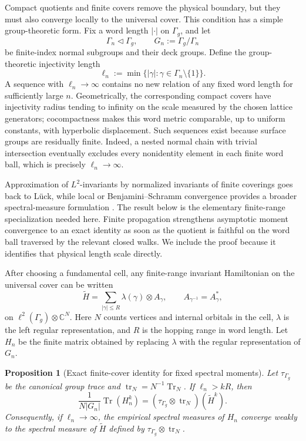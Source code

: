 \documentclass[11pt]{article}
\newtheorem{proposition}[theorem]{Proposition}
\theoremstyle{definition}
\theoremstyle{remark}
\newcommand{\CC}{\mathbb C}
\newcommand{\Tr}{\operatorname{Tr}}
\newcommand{\tr}{\operatorname{tr}}
\begin{document}
Compact quotients and finite covers remove the physical boundary, but they
must also converge locally to the universal cover.  This condition has a
simple group-theoretic form.  Fix a word length \(|\cdot|\) on
\(\Gamma_g\), and let
\[
  \Gamma_n\triangleleft\Gamma_g,\qquad
  G_n:=\Gamma_g/\Gamma_n
\]
be finite-index normal subgroups and their deck groups.  Define the
group-theoretic injectivity length
\[
       \ell_n
        :=\min\{|\gamma|:\gamma\in\Gamma_n\setminus\{1\}\}.
 \tag{10.3}\label{eq:cover-injectivity-length}
\]
A sequence with \(\ell_n\to\infty\) contains no new relation of any fixed
word length for sufficiently large \(n\).  Geometrically, the corresponding
compact covers have injectivity radius tending to infinity on the scale
measured by the chosen lattice generators; cocompactness makes this word
metric comparable, up to uniform constants, with hyperbolic displacement.
Such sequences exist because surface groups are residually finite.  Indeed,
a nested normal chain with trivial intersection eventually excludes every
nonidentity element in each finite word ball, which is precisely
\(\ell_n\to\infty\).

Approximation of \(L^2\)-invariants by normalized invariants of finite
coverings goes back to L\"uck, while local or Benjamini--Schramm convergence
provides a broader spectral-measure formulation
\cite{Luck1994,AbertThomVirag2014}.  The result below is the elementary
finite-range specialization needed here.  Finite propagation strengthens
asymptotic moment convergence to an exact identity as soon as the quotient is
faithful on the word ball traversed by the relevant closed walks.  We include
the proof because it identifies that physical length scale directly.

After choosing a fundamental cell, any finite-range invariant Hamiltonian on
the universal cover can be written
\[
  \widetilde H
     =\sum_{|\gamma|\leq R}
        \lambda(\gamma)\otimes A_\gamma,
  \qquad
  A_{\gamma^{-1}}=A_\gamma^*,
 \tag{10.4}\label{eq:finite-range-group-operator}
\]
on \(\ell^2(\Gamma_g)\otimes\CC^N\).  Here \(N\) counts vertices and internal
orbitals in the cell, \(\lambda\) is the left regular representation, and
\(R\) is the hopping range in word length.  Let \(H_n\) be the finite matrix
obtained by replacing \(\lambda\) with the regular representation of \(G_n\).

\begin{proposition}[Exact finite-cover identity for fixed spectral moments]
\label{prop:finite-cover-moments}
Let \(\tau_{\Gamma_g}\) be the canonical group trace and
\(\tr_N=N^{-1}\Tr_N\).  If \(\ell_n>kR\), then
\[
   \frac{1}{N|G_n|}\Tr(H_n^k)
       =(\tau_{\Gamma_g}\otimes\tr_N)(\widetilde H^k).
 \tag{10.5}\label{eq:finite-cover-moment}
\]
Consequently, if \(\ell_n\to\infty\), the empirical spectral measures of
\(H_n\) converge weakly to the spectral measure of \(\widetilde H\) defined
by \(\tau_{\Gamma_g}\otimes\tr_N\).
\end{proposition}
\end{document}
